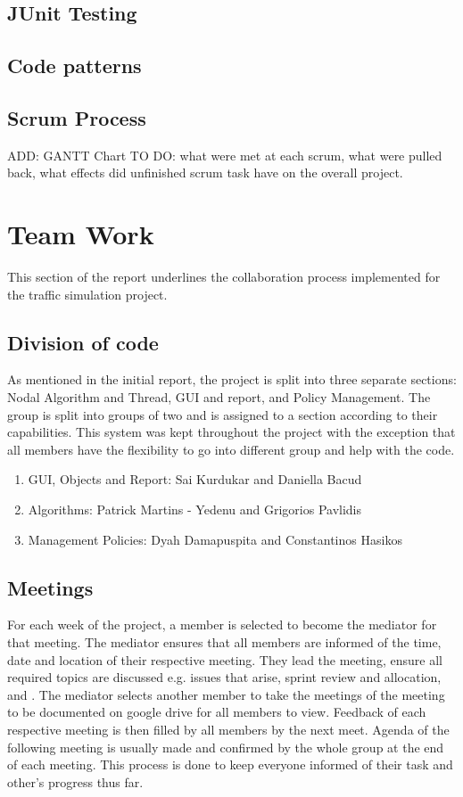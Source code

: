 \documentclass{article}[11pt,Tahoma]
\begin{document}
		\subsection{JUnit Testing}
	 	\subsection{Code patterns}
		\subsection{Scrum Process}
			ADD: GANTT Chart
			TO DO: what were met at each scrum, what were pulled back, what effects did unfinished scrum task have on the overall project.
	\section{Team Work}
		This section of the report underlines the collaboration process implemented for the traffic simulation project.
		\subsection{Division of code}
			As mentioned in the initial report, the project is split into three separate sections: Nodal Algorithm and Thread, GUI and report, and Policy Management.  The group is split into groups of two and is assigned to a section according to their capabilities.  This system was kept throughout the project with the exception that all members have the flexibility to go into different group and help with the code.  
			\begin{enumerate}[noitemsep]
                \item GUI, Objects and Report: Sai Kurdukar and Daniella Bacud
                \item Algorithms: Patrick Martins - Yedenu and Grigorios Pavlidis
                \item Management Policies: Dyah Damapuspita and Constantinos Hasikos
            \end{enumerate}
		\subsection{Meetings}
			For each week of the project, a member is selected to become the mediator for that meeting.  The mediator ensures that all members are informed of the time, date and location of their respective meeting.  They lead the meeting, ensure all required topics are discussed e.g. issues that arise, sprint review and allocation, and .  The mediator selects another member to take the meetings of the meeting to be documented on google drive for all members to view.  Feedback of each respective meeting is then filled by all members by the next meet.  Agenda of the following meeting is usually made and confirmed by the whole group at the end of each meeting.  This process is done to keep everyone informed of their task and other's progress thus far.
			
\end{document}
